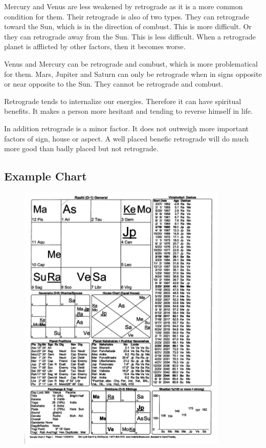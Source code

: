 Mercury and Venus are less weakened by retrograde as it is a more common condition for them. Their retrograde is also of two types. They can retrograde toward the Sun, which is in the direction of combust. This is more difficult. Or they can retrograde away from the Sun. This is less difficult. When a retrograde planet is afflicted by other factors, then it becomes worse.

 

Venus and Mercury can be retrograde and combust, which is more problematical for them. Mars, Jupiter and Saturn can only be retrograde when in signs opposite or near opposite to the Sun. They cannot be retrograde and combust.

 

Retrograde tends to internalize our energies. Therefore it can have spiritual benefits.  It makes a person more hesitant and tending to reverse himself in life.

 

In addition retrograde is a minor factor. It does not outweigh more important factors of sign, house or aspect. A well placed benefic retrograde will do much more good than badly placed but not retrograde.

 

\subsection{Example Chart}

\begin{figure}[h]
\centering
\includegraphics[width=10cm]{pics/lesson-2-Sample-Chart-2.jpeg}
\caption{}
\end{figure}


